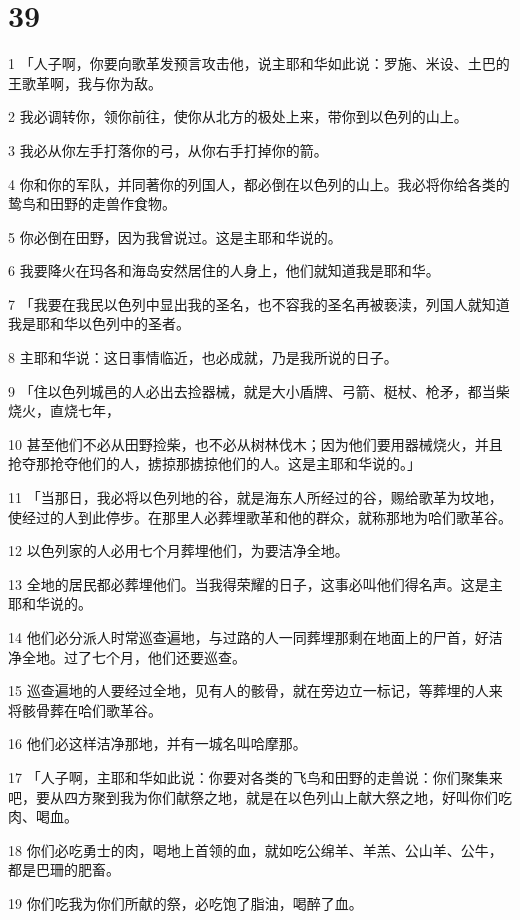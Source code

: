 \chapter{39}

\par 1 「人子啊，你要向歌革发预言攻击他，说主耶和华如此说：罗施、米设、土巴的王歌革啊，我与你为敌。
\par 2 我必调转你，领你前往，使你从北方的极处上来，带你到以色列的山上。
\par 3 我必从你左手打落你的弓，从你右手打掉你的箭。
\par 4 你和你的军队，并同著你的列国人，都必倒在以色列的山上。我必将你给各类的鸷鸟和田野的走兽作食物。
\par 5 你必倒在田野，因为我曾说过。这是主耶和华说的。
\par 6 我要降火在玛各和海岛安然居住的人身上，他们就知道我是耶和华。
\par 7 「我要在我民以色列中显出我的圣名，也不容我的圣名再被亵渎，列国人就知道我是耶和华以色列中的圣者。
\par 8 主耶和华说：这日事情临近，也必成就，乃是我所说的日子。
\par 9 「住以色列城邑的人必出去捡器械，就是大小盾牌、弓箭、梃杖、枪矛，都当柴烧火，直烧七年，
\par 10 甚至他们不必从田野捡柴，也不必从树林伐木；因为他们要用器械烧火，并且抢夺那抢夺他们的人，掳掠那掳掠他们的人。这是主耶和华说的。」
\par 11 「当那日，我必将以色列地的谷，就是海东人所经过的谷，赐给歌革为坟地，使经过的人到此停步。在那里人必葬埋歌革和他的群众，就称那地为哈们歌革谷。
\par 12 以色列家的人必用七个月葬埋他们，为要洁净全地。
\par 13 全地的居民都必葬埋他们。当我得荣耀的日子，这事必叫他们得名声。这是主耶和华说的。
\par 14 他们必分派人时常巡查遍地，与过路的人一同葬埋那剩在地面上的尸首，好洁净全地。过了七个月，他们还要巡查。
\par 15 巡查遍地的人要经过全地，见有人的骸骨，就在旁边立一标记，等葬埋的人来将骸骨葬在哈们歌革谷。
\par 16 他们必这样洁净那地，并有一城名叫哈摩那。
\par 17 「人子啊，主耶和华如此说：你要对各类的飞鸟和田野的走兽说：你们聚集来吧，要从四方聚到我为你们献祭之地，就是在以色列山上献大祭之地，好叫你们吃肉、喝血。
\par 18 你们必吃勇士的肉，喝地上首领的血，就如吃公绵羊、羊羔、公山羊、公牛，都是巴珊的肥畜。
\par 19 你们吃我为你们所献的祭，必吃饱了脂油，喝醉了血。
